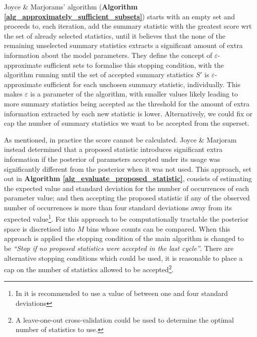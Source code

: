 \documentclass[11pt,a4paper]{article}
\theoremstyle{break}
\begin{document}
  \par Joyce \& Marjorams' algorithm (\textbf{Algorithm \ref{alg_approximately_sufficient_subsets}}) starts with an empty set and proceeds to, each iteration, add the summary statistic with the greatest score wrt the set of already selected statistics, until it believes that the none of the remaining unselected summary statistics extracts a significant amount of extra information about the model parameters. They define the concept of $\varepsilon$-approximate sufficient sets to formalise this stopping condition, with the algorithm running until the set of accepted summary statistics $S'$ is $\varepsilon$-approximate sufficient for each unchosen summary statistic, individually. This makes $\varepsilon$ is a parameter of the algorithm, with smaller values likely leading to more summary statistics being accepted as the threshold for the amount of extra information extracted by each new statistic is lower. Alternatively, we could fix or cap the number of summary statistics we want to be accepted from the superset.

  \par As mentioned, in practice the score cannot be calculated. Joyce \& Marjoram instead determined that a proposed statistic introduces significant extra information if the posterior of parameters accepted under its usage was significantly different from the posterior when it was not used. This approach, set out in \textbf{Algorithm \ref{alg_evaluate_proposed_statistic}}, consists of estimating the expected value and standard deviation for the number of occurrences of each parameter value; and then accepting the proposed statistic if any of the observed number of occurrences is more than four standard deviations away from its expected value\footnote{In \cite[]{Approximately_sufficient_statistics_and_bayesian_computation} it is recommended to use a value of between one and four standard deviations}. For this approach to be computationally tractable the posterior space is discretised into $M$ bins whose counts can be compared. When this approach is applied the stopping condition of the main algorithm is changed to be \textit{``Stop if no proposed statistics were accepted in the last cycle''}. There are alternative stopping conditions which could be used, it is reasonable to place a cap on the number of statistics allowed to be accepted\footnote{A leave-one-out cross-validation could be used to determine the optimal number of statistics to use.}.
\end{document}
